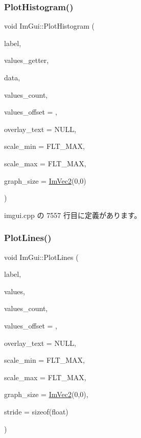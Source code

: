 \subsubsection{\texorpdfstring{Plot\+Histogram()}{PlotHistogram()}\hspace{0.1cm}{\footnotesize\ttfamily [2/2]}}
{\footnotesize\ttfamily void Im\+Gui\+::\+Plot\+Histogram (\begin{DoxyParamCaption}\item[{const char $\ast$}]{label,  }\item[{float($\ast$)(void $\ast$data, int idx)}]{values\+\_\+getter,  }\item[{void $\ast$}]{data,  }\item[{int}]{values\+\_\+count,  }\item[{int}]{values\+\_\+offset = {},  }\item[{const char $\ast$}]{overlay\+\_\+text = {\ttfamily NULL},  }\item[{float}]{scale\+\_\+min = {\ttfamily FLT\+\_\+MAX},  }\item[{float}]{scale\+\_\+max = {\ttfamily FLT\+\_\+MAX},  }\item[{\mbox{\hyperlink{struct_im_vec2}{Im\+Vec2}}}]{graph\+\_\+size = {\ttfamily \mbox{\hyperlink{struct_im_vec2}{Im\+Vec2}}(0,0)} }\end{DoxyParamCaption})}



 imgui.\+cpp の 7557 行目に定義があります。

\mbox{\label{namespace_im_gui_a2bc21c56e4796855313804086cca114f}} 
\subsubsection{\texorpdfstring{Plot\+Lines()}{PlotLines()}\hspace{0.1cm}{\footnotesize\ttfamily [1/2]}}
{\footnotesize\ttfamily void Im\+Gui\+::\+Plot\+Lines (\begin{DoxyParamCaption}\item[{const char $\ast$}]{label,  }\item[{const float $\ast$}]{values,  }\item[{int}]{values\+\_\+count,  }\item[{int}]{values\+\_\+offset = {},  }\item[{const char $\ast$}]{overlay\+\_\+text = {\ttfamily NULL},  }\item[{float}]{scale\+\_\+min = {\ttfamily FLT\+\_\+MAX},  }\item[{float}]{scale\+\_\+max = {\ttfamily FLT\+\_\+MAX},  }\item[{\mbox{\hyperlink{struct_im_vec2}{Im\+Vec2}}}]{graph\+\_\+size = {\ttfamily \mbox{\hyperlink{struct_im_vec2}{Im\+Vec2}}(0,0)},  }\item[{int}]{stride = {\ttfamily sizeof(float)} }\end{DoxyParamCaption})}



